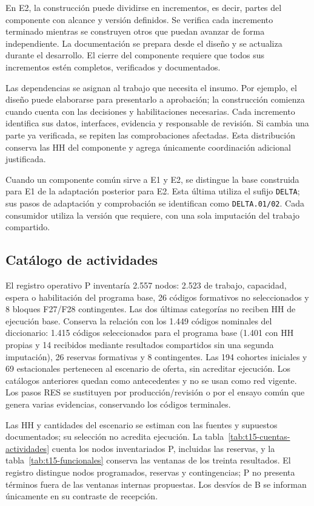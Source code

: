 En E2, la construcción puede dividirse en incrementos, es decir, partes del componente con alcance y versión definidos. Se verifica cada incremento terminado mientras se construyen otros que puedan avanzar de forma independiente. La documentación se prepara desde el diseño y se actualiza durante el desarrollo. El cierre del componente requiere que todos sus incrementos estén completos, verificados y documentados.

Las dependencias se asignan al trabajo que necesita el insumo. Por ejemplo, el diseño puede elaborarse para presentarlo a aprobación; la construcción comienza cuando cuenta con las decisiones y habilitaciones necesarias. Cada incremento identifica sus datos, interfaces, evidencia y responsable de revisión. Si cambia una parte ya verificada, se repiten las comprobaciones afectadas. Esta distribución conserva las HH del componente y agrega únicamente coordinación adicional justificada.

Cuando un componente común sirve a E1 y E2, se distingue la base construida para E1 de la adaptación posterior para E2. Esta última utiliza el sufijo \texttt{DELTA}; sus pasos de adaptación y comprobación se identifican como \texttt{DELTA.01/02}. Cada consumidor utiliza la versión que requiere, con una sola imputación del trabajo compartido.

\subsection{Catálogo de actividades}
El registro operativo P inventaría 2.557 nodos: 2.523 de trabajo, capacidad, espera o habilitación del programa base, 26 códigos formativos no seleccionados y 8 bloques F27/F28 contingentes. Las dos últimas categorías no reciben HH de ejecución base. Conserva la relación con los 1.449 códigos nominales del diccionario: 1.415 códigos seleccionados para el programa base (1.401 con HH propias y 14 recibidos mediante resultados compartidos sin una segunda imputación), 26 reservas formativas y 8 contingentes. Las 194 cohortes iniciales y 69 estacionales pertenecen al escenario de oferta, sin acreditar ejecución. Los catálogos anteriores quedan como antecedentes y no se usan como red vigente. Los pasos RES se sustituyen por producción/revisión o por el ensayo común que genera varias evidencias, conservando los códigos terminales.

Las HH y cantidades del escenario se estiman con las fuentes y supuestos documentados; su selección no acredita ejecución. La tabla~\ref{tab:t15-cuentas-actividades} cuenta los nodos inventariados P, incluidas las reservas, y la tabla~\ref{tab:t15-funcionales} conserva las ventanas de los treinta resultados. El registro distingue nodos programados, reservas y contingencias; P no presenta términos fuera de las ventanas internas propuestas. Los desvíos de B se informan únicamente en su contraste de recepción.

